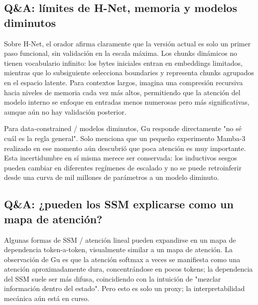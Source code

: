 \documentclass[a4paper]{article}
\begin{document}
\subsection{Q\&A: límites de H-Net, memoria y modelos diminutos}

Sobre H-Net, el orador afirma claramente que la versión actual es solo un primer paso funcional, sin validación en la escala máxima. Los chunks dinámicos no tienen vocabulario infinito: los bytes iniciales entran en embeddings limitados, mientras que lo subsiguiente selecciona boundaries y representa chunks agrupados en el espacio latente. Para contextos largos, imagina una compresión recursiva hacia niveles de memoria cada vez más altos, permitiendo que la atención del modelo interno se enfoque en entradas menos numerosas pero más significativas, aunque aún no hay validación posterior.


Para data-constrained / modelos diminutos, Gu responde directamente "no sé cuál es la regla general". Solo menciona que un pequeño experimento Mamba-3 realizado en ese momento aún descubrió que poca atención es muy importante. Esta incertidumbre en sí misma merece ser conservada: los inductivos sesgos pueden cambiar en diferentes regímenes de escalado y no se puede retroinferir desde una curva de mil millones de parámetros a un modelo diminuto.

\subsection{Q\&A: ¿pueden los SSM explicarse como un mapa de atención?}

Algunas formas de SSM / atención lineal pueden expandirse en un mapa de dependencia token-a-token, visualmente similar a un mapa de atención. La observación de Gu es que la atención softmax a veces se manifiesta como una atención aproximadamente dura, concentrándose en pocos tokens; la dependencia del SSM suele ser más difusa, coincidiendo con la intuición de "mezclar información dentro del estado". Pero esto es solo un proxy; la interpretabilidad mecánica aún está en curso.

\end{document}
